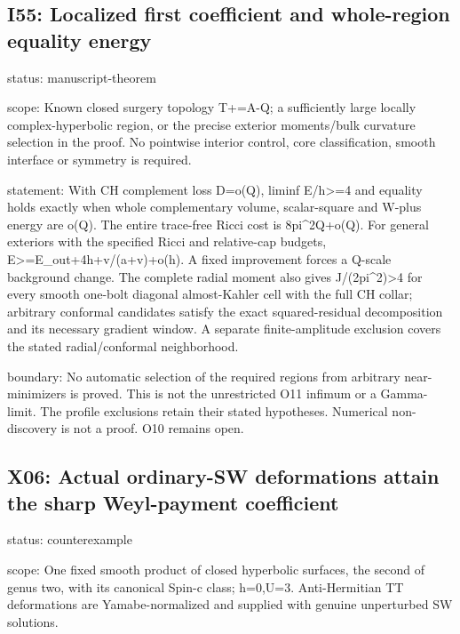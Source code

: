\documentclass[
  10pt,
]{article}
\begin{document}
\hypertarget{i55-localized-first-coefficient-and-whole-region-equality-energy}{%
\subsection{I55: Localized first coefficient and whole-region equality
energy}\label{i55-localized-first-coefficient-and-whole-region-equality-energy}}

status: manuscript-theorem

scope: Known closed surgery topology T+=A-Q; a sufficiently large
locally complex-hyperbolic region, or the precise exterior moments/bulk
curvature selection in the proof. No pointwise interior control, core
classification, smooth interface or symmetry is required.

statement: With CH complement loss D=o(Q), liminf E/h\textgreater=4 and
equality holds exactly when whole complementary volume, scalar-square
and W-plus energy are o(Q). The entire trace-free Ricci cost is
8pi\^{}2Q+o(Q). For general exteriors with the specified Ricci and
relative-cap budgets, E\textgreater=E\_out+4h+v/(a+v)+o(h). A fixed
improvement forces a Q-scale background change. The complete radial
moment also gives J/(2pi\^{}2)\textgreater4 for every smooth one-bolt
diagonal almost-Kahler cell with the full CH collar; arbitrary conformal
candidates satisfy the exact squared-residual decomposition and its
necessary gradient window. A separate finite-amplitude exclusion covers
the stated radial/conformal neighborhood.

boundary: No automatic selection of the required regions from arbitrary
near-minimizers is proved. This is not the unrestricted O11 infimum or a
Gamma-limit. The profile exclusions retain their stated hypotheses.
Numerical non-discovery is not a proof. O10 remains open.

\hypertarget{x06-actual-ordinary-sw-deformations-attain-the-sharp-weyl-payment-coefficient}{%
\subsection{X06: Actual ordinary-SW deformations attain the sharp
Weyl-payment
coefficient}\label{x06-actual-ordinary-sw-deformations-attain-the-sharp-weyl-payment-coefficient}}

status: counterexample

scope: One fixed smooth product of closed hyperbolic surfaces, the
second of genus two, with its canonical Spin-c class; h=0,U=3.
Anti-Hermitian TT deformations are Yamabe-normalized and supplied with
genuine unperturbed SW solutions.
\end{document}
